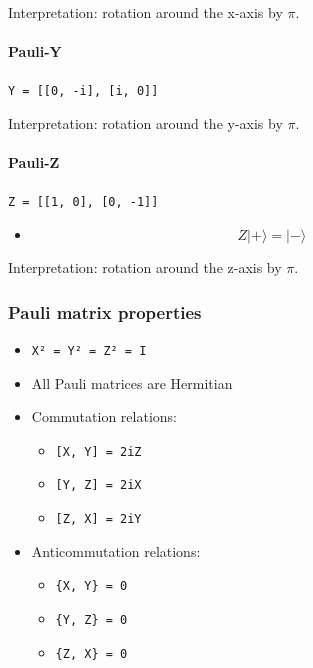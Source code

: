 \documentclass[
]{article}
\providecommand{\tightlist}{%
  \setlength{\itemsep}{0pt}\setlength{\parskip}{0pt}}
\begin{document}
Interpretation: rotation around the x-axis by $\pi$.

\paragraph{Pauli-Y}\label{pauli-y}

\texttt{Y\ =\ {[}{[}0,\ -i{]},\ {[}i,\ 0{]}{]}}

Interpretation: rotation around the y-axis by $\pi$.

\paragraph{Pauli-Z}\label{pauli-z}

\texttt{Z\ =\ {[}{[}1,\ 0{]},\ {[}0,\ -1{]}{]}}

\begin{itemize}
\tightlist
\item
$$Z|+\rangle = |-\rangle$$
\end{itemize}

Interpretation: rotation around the z-axis by $\pi$.

\subsubsection{Pauli matrix properties}\label{pauli-matrix-properties}

\begin{itemize}
\tightlist
\item
  \texttt{X²\ =\ Y²\ =\ Z²\ =\ I}
\item
  All Pauli matrices are Hermitian
\item
  Commutation relations:

  \begin{itemize}
  \tightlist
  \item
    \texttt{{[}X,\ Y{]}\ =\ 2iZ}
  \item
    \texttt{{[}Y,\ Z{]}\ =\ 2iX}
  \item
    \texttt{{[}Z,\ X{]}\ =\ 2iY}
  \end{itemize}
\item
  Anticommutation relations:

  \begin{itemize}
  \tightlist
  \item
    \texttt{\{X,\ Y\}\ =\ 0}
  \item
    \texttt{\{Y,\ Z\}\ =\ 0}
  \item
    \texttt{\{Z,\ X\}\ =\ 0}
  \end{itemize}
\end{itemize}
\end{document}
